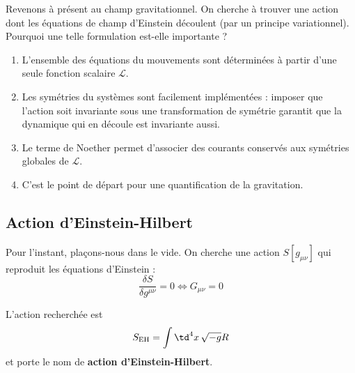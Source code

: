 Revenons à présent au champ gravitationnel. On cherche à trouver une action dont les équations de champ d'Einstein découlent (par un principe variationnel). Pourquoi une telle formulation est-elle importante ?
\begin{enumerate}
    \item L'ensemble des équations du mouvements sont déterminées à partir d'une seule fonction scalaire $\mathcal{L}$. 
    \item Les symétries du systèmes sont facilement implémentées : imposer que l'action soit invariante sous une transformation de symétrie garantit que la dynamique qui en découle est invariante aussi.
    \item Le terme de Noether permet d'associer des courants conservés aux symétries globales de $\mathcal{L}$. 
    \item C'est le point de départ pour une quantification de la gravitation.
\end{enumerate}

\subsection{Action d'Einstein-Hilbert}
Pour l'instant, plaçons-nous dans le vide. On cherche une action $S[g_{\mu \nu}]$ qui reproduit les équations d'Einstein :
\begin{equation}
    \label{eq:action einstein vide}
    \frac{\delta S}{\delta g^{\mu \nu}} = 0 \iff G_{\mu \nu} = 0
\end{equation}
\begin{theoremframe}
    \begin{theorem}
        L'action recherchée est
        \begin{equation}
            S_{\text{EH}} = \int \td ^4x \, \sqrt{-g}R
        \end{equation}
        et porte le nom de \textbf{action d'Einstein-Hilbert}. 
    \end{theorem}
\end{theoremframe}


